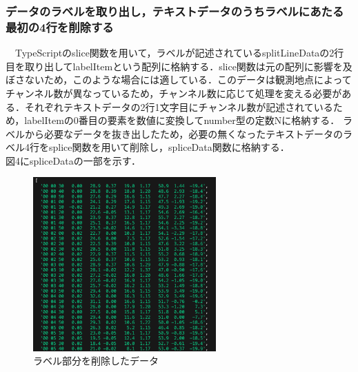  \subsubsection{データのラベルを取り出し，テキストデータのうちラベルにあたる最初の4行を削除する}
　TypeScriptのslice関数を用いて，ラベルが記述されているsplitLineDataの2行目を取り出してlabelItemという配列に格納する．slice関数は元の配列に影響を及ぼさないため，このような場合には適している．\cite{mdn_slice}このデータは観測地点によってチャンネル数が異なっているため，チャンネル数に応じて処理を変える必要がある．それぞれテキストデータの2行1文字目にチャンネル数が記述されているため，labelItemの0番目の要素を数値に変換してnumber型の定数Nに格納する．
 ラベルから必要なデータを抜き出したため，必要の無くなったテキストデータのラベル4行をsplice関数を用いて削除し，spliceData関数に格納する．\\
 図4にspliceDataの一部を示す．\\
 \begin{figure}[h]
   \centering
   \includegraphics[width=70mm]{fig/spliceData.png}
   \caption{ラベル部分を削除したデータ}
 \end{figure}
 
